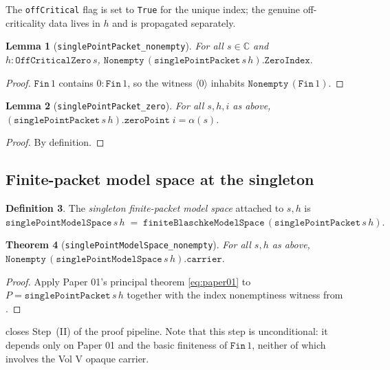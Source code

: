 \documentclass[12pt]{article}
\newtheorem{theorem}{Theorem}[section]
\newtheorem{lemma}[theorem]{Lemma}
\theoremstyle{definition}
\newtheorem{definition}[theorem]{Definition}
\theoremstyle{remark}
\newcommand{\C}{\mathbb{C}}
\begin{document}
The \texttt{offCritical} flag is set to \texttt{True} for the unique index;
the genuine off-criticality data lives in $h$ and is propagated separately.

\begin{lemma}[\texttt{singlePointPacket\_nonempty}]\label{lem:single-nonempty}
For all $s\in\C$ and $h:\texttt{OffCriticalZero}\,s$,
\(
\texttt{Nonempty}\,(\texttt{singlePointPacket}\,s\,h).\texttt{ZeroIndex}.
\)
\end{lemma}

\begin{proof}
$\texttt{Fin}\,1$ contains $0:\texttt{Fin}\,1$, so the witness
$\langle 0\rangle$ inhabits $\texttt{Nonempty}\,(\texttt{Fin}\,1)$.
\end{proof}

\begin{lemma}[\texttt{singlePointPacket\_zero}]\label{lem:single-zero}
For all $s, h, i$ as above,
\(
(\texttt{singlePointPacket}\,s\,h).\texttt{zeroPoint}\;i = \alpha(s).
\)
\end{lemma}

\begin{proof}
By definition.
\end{proof}

\subsection{Finite-packet model space at the singleton}

\begin{definition}\label{def:single-model}
The \emph{singleton finite-packet model space} attached to $s,h$ is
\(
\texttt{singlePointModelSpace}\,s\,h \;=\;
\texttt{finiteBlaschkeModelSpace}\,(\texttt{singlePointPacket}\,s\,h).
\)
\end{definition}

\begin{theorem}[\texttt{singlePointModelSpace\_nonempty}]\label{thm:single-nonempty}
For all $s,h$ as above,
\(
\texttt{Nonempty}\,(\texttt{singlePointModelSpace}\,s\,h).\texttt{carrier}.
\)
\end{theorem}

\begin{proof}
Apply Paper 01's principal theorem
\eqref{eq:paper01} to
$P=\texttt{singlePointPacket}\,s\,h$ together with the index nonemptiness
witness from .
\end{proof}

 closes Step~(II) of the proof pipeline. Note
that this step is unconditional: it depends only on Paper 01 and the basic
finiteness of $\texttt{Fin}\,1$, neither of which involves the Vol V
opaque carrier.
\end{document}
